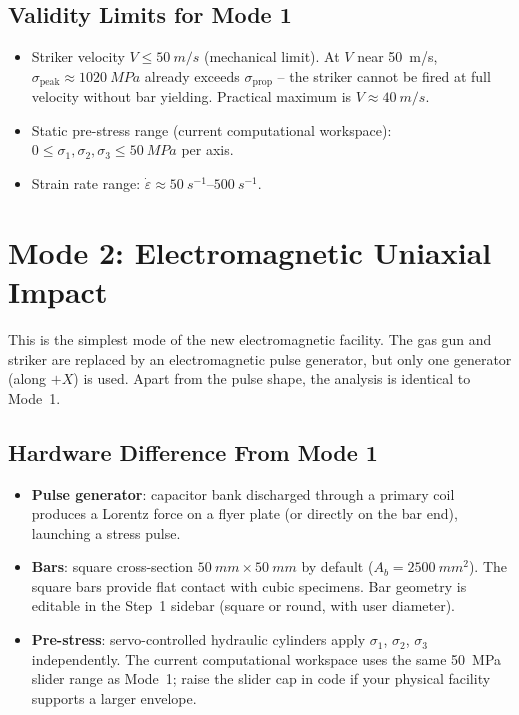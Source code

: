 \documentclass[11pt,a4paper]{article}
\providecommand{\SI}[2]{\qty{#1}{#2}}
\providecommand{\SIrange}[3]{\qtyrange{#1}{#2}{#3}}
\newcommand{\sig}{\sigma}
\newcommand{\eps}{\varepsilon}
\newcommand{\epsdot}{\dot\eps}
\newcommand{\Ab}{A_b}
\newcommand{\sigprop}{\sig_{\text{prop}}}
\newcommand{\sigpeak}{\sig_{\text{peak}}}
\begin{document}
\subsection{Validity Limits for Mode 1}

\begin{itemize}[leftmargin=*]
  \item Striker velocity $V \leq \SI{50}{m/s}$ (mechanical limit). At $V$ near
        \SI{50}{m/s}, $\sigpeak \approx \SI{1020}{MPa}$ already exceeds
        $\sigprop$ -- the striker cannot be fired at full velocity without
        bar yielding. Practical maximum is $V \approx \SI{40}{m/s}$.
  \item Static pre-stress range (current computational workspace):
        $0 \leq \sig_1, \sig_2, \sig_3 \leq \SI{50}{MPa}$ per axis.
  \item Strain rate range: $\epsdot \approx \SIrange{50}{500}{s^{-1}}$.
\end{itemize}

\newpage
\section{Mode 2: Electromagnetic Uniaxial Impact}

This is the simplest mode of the new electromagnetic facility. The gas gun and
striker are replaced by an electromagnetic pulse generator, but only one
generator (along $+X$) is used. Apart from the pulse shape, the analysis is
identical to Mode~1.

\subsection{Hardware Difference From Mode 1}

\begin{itemize}[leftmargin=*]
  \item \textbf{Pulse generator}: capacitor bank discharged through a primary
        coil produces a Lorentz force on a flyer plate (or directly on the bar
        end), launching a stress pulse.
  \item \textbf{Bars}: square cross-section $\SI{50}{mm} \times \SI{50}{mm}$
        by default ($\Ab = \SI{2500}{mm^2}$). The square bars provide flat
        contact with cubic specimens. Bar geometry is editable in the Step~1
        sidebar (square or round, with user diameter).
  \item \textbf{Pre-stress}: servo-controlled hydraulic cylinders apply
        $\sig_1$, $\sig_2$, $\sig_3$ independently. The current computational workspace
        uses the same \SI{50}{MPa} slider range as Mode~1; raise the slider
        cap in code if your physical facility supports a larger envelope.
\end{itemize}
\end{document}
